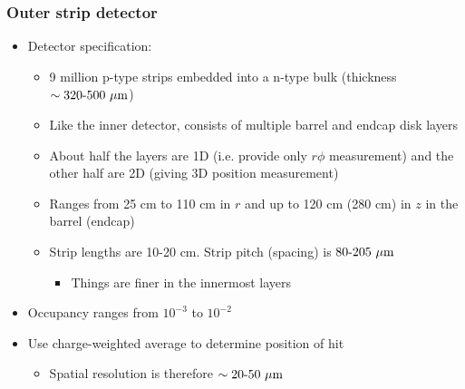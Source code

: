 \subsubsection{Outer strip detector}
\begin{itemize}
  \item Detector specification:
  \begin{itemize}
    \item 9 million p-type strips embedded into a n-type bulk (thickness $\sim320\textto500~\mum$)
    \item Like the inner detector, consists of multiple barrel and endcap disk layers
    \item About half the layers are 1D (i.e. provide only $r\phi$ measurement) and the other half are 2D (giving 3D position measurement)
    \item Ranges from 25 cm to 110 cm in $r$ and up to 120 cm (280 cm) in $z$ in the barrel (endcap)
    \item Strip lengths are 10-20 cm. Strip pitch (spacing) is $80\textto205~\mum$
    \begin{itemize}
      \item Things are finer in the innermost layers
    \end{itemize}
  \end{itemize}
  \item Occupancy ranges from $10^{-3}$ to $10^{-2}$
  \item Use charge-weighted average to determine position of hit
  \begin{itemize}
      \item Spatial resolution is therefore $\sim 20\textto50~\mum$
  \end{itemize}
\end{itemize}

